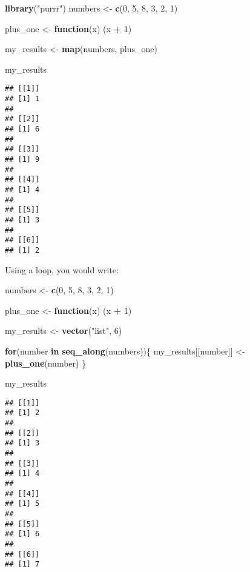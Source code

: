 \documentclass[
]{article}
\newenvironment{Shaded}{\begin{snugshade}}{\end{snugshade}}
\newcommand{\ControlFlowTok}[1]{\textcolor[rgb]{0.13,0.29,0.53}{\textbf{#1}}}
\newcommand{\DecValTok}[1]{\textcolor[rgb]{0.00,0.00,0.81}{#1}}
\newcommand{\KeywordTok}[1]{\textcolor[rgb]{0.13,0.29,0.53}{\textbf{#1}}}
\newcommand{\NormalTok}[1]{#1}
\newcommand{\OperatorTok}[1]{\textcolor[rgb]{0.81,0.36,0.00}{\textbf{#1}}}
\newcommand{\StringTok}[1]{\textcolor[rgb]{0.31,0.60,0.02}{#1}}
\begin{document}
\begin{Shaded}
\begin{Highlighting}[]
\KeywordTok{library}\NormalTok{(}\StringTok{"purrr"}\NormalTok{)}
\NormalTok{numbers \textless{}{-}}\StringTok{ }\KeywordTok{c}\NormalTok{(}\DecValTok{0}\NormalTok{, }\DecValTok{5}\NormalTok{, }\DecValTok{8}\NormalTok{, }\DecValTok{3}\NormalTok{, }\DecValTok{2}\NormalTok{, }\DecValTok{1}\NormalTok{)}

\NormalTok{plus\_one \textless{}{-}}\StringTok{ }\ControlFlowTok{function}\NormalTok{(x) (x }\OperatorTok{+}\StringTok{ }\DecValTok{1}\NormalTok{)}

\NormalTok{my\_results \textless{}{-}}\StringTok{ }\KeywordTok{map}\NormalTok{(numbers, plus\_one)}

\NormalTok{my\_results}
\end{Highlighting}
\end{Shaded}

\begin{verbatim}
## [[1]]
## [1] 1
## 
## [[2]]
## [1] 6
## 
## [[3]]
## [1] 9
## 
## [[4]]
## [1] 4
## 
## [[5]]
## [1] 3
## 
## [[6]]
## [1] 2
\end{verbatim}

Using a loop, you would write:

\begin{Shaded}
\begin{Highlighting}[]
\NormalTok{numbers \textless{}{-}}\StringTok{ }\KeywordTok{c}\NormalTok{(}\DecValTok{0}\NormalTok{, }\DecValTok{5}\NormalTok{, }\DecValTok{8}\NormalTok{, }\DecValTok{3}\NormalTok{, }\DecValTok{2}\NormalTok{, }\DecValTok{1}\NormalTok{)}

\NormalTok{plus\_one \textless{}{-}}\StringTok{ }\ControlFlowTok{function}\NormalTok{(x) (x }\OperatorTok{+}\StringTok{ }\DecValTok{1}\NormalTok{)}

\NormalTok{my\_results \textless{}{-}}\StringTok{ }\KeywordTok{vector}\NormalTok{(}\StringTok{"list"}\NormalTok{, }\DecValTok{6}\NormalTok{)}

\ControlFlowTok{for}\NormalTok{(number }\ControlFlowTok{in} \KeywordTok{seq\_along}\NormalTok{(numbers))\{}
\NormalTok{  my\_results[[number]] \textless{}{-}}\StringTok{ }\KeywordTok{plus\_one}\NormalTok{(number)}
\NormalTok{\}}

\NormalTok{my\_results}
\end{Highlighting}
\end{Shaded}

\begin{verbatim}
## [[1]]
## [1] 2
## 
## [[2]]
## [1] 3
## 
## [[3]]
## [1] 4
## 
## [[4]]
## [1] 5
## 
## [[5]]
## [1] 6
## 
## [[6]]
## [1] 7
\end{verbatim}
\end{document}
